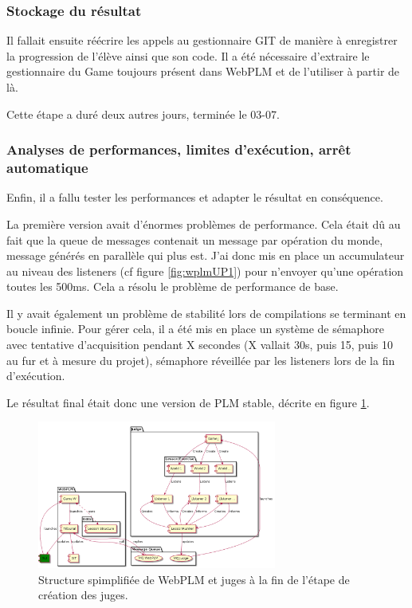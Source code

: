 \documentclass[stage]{tnreport}
\begin{document}
\subsubsection{Stockage du résultat}
Il fallait ensuite réécrire les appels au gestionnaire GIT de manière à enregistrer la progression de l'élève ainsi que son code. Il a été nécessaire d'extraire le gestionnaire du Game toujours présent dans WebPLM et de l'utiliser à partir de là.

Cette étape a duré deux autres jours, terminée le 03-07.

\subsubsection{Analyses de performances, limites d'exécution, arrêt automatique}
Enfin, il a fallu tester les performances et adapter le résultat en conséquence.

La première version avait d'énormes problèmes de performance. Cela était dû au fait que la queue de messages contenait un message par opération du monde, message générés en parallèle qui plus est.
J'ai donc mis en place un accumulateur au niveau des listeners (cf figure \ref{fig:wplmUP1}) pour n'envoyer qu'une opération toutes les 500ms. Cela a résolu le problème de performance de base.

Il y avait également un problème de stabilité lors de compilations se terminant en boucle infinie. Pour gérer cela, il a été mis en place un système de sémaphore avec tentative d'acquisition pendant X secondes (X vallait 30s, puis 15, puis 10 au fur et à mesure du projet), sémaphore réveillée par les listeners lors de la fin d'exécution.

Le résultat final était donc une version de PLM stable, décrite en figure \ref{fig:wplmUP2}.
\begin{figure}[h]
	\centering
		\includegraphics[width=0.7\textwidth]{figures/WebPLM-uml-cp2}
	\caption{Structure spimplifiée de WebPLM et juges à la fin de l'étape de création des juges.}
	\label{fig:wplmUP2}
\end{figure}
\end{document}
